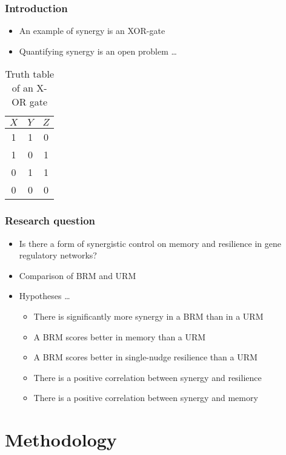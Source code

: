\documentclass[hyperref={pdfpagelabels=false}]{beamer}
\begin{document}
\begin{frame}
\frametitle{Introduction}
\begin{itemize}
\item An example of synergy is an XOR-gate
\item Quantifying synergy is an open problem \cite{griffith2011quantifying, olbrich2015information} \dots{}
\end{itemize}
\begin{table}[ht]
\begin{center}
\begin{tabular}{|c|c||c|}
\hline
$X$ & $Y$ & $Z$ \\
\hline
\hline
1 & 1 & 0 \\
1 & 0 & 1 \\
0 & 1 & 1 \\
0 & 0 & 0 \\
\hline
\end{tabular}
\end{center}
\caption{Truth table of an X-OR gate}
\label{XOR}
\end{table}
\end{frame}

\begin{frame}
\frametitle{Research question}
\begin{itemize}
\item Is there a form of synergistic control on memory and resilience in gene regulatory networks?
\item Comparison of BRM and URM
\item Hypotheses \dots{}
\begin{itemize}
\item There is significantly more synergy in a BRM than in a URM
\item A BRM scores better in memory than a URM
\item A BRM scores better in single-nudge resilience than a URM
\item There is a positive correlation between synergy and resilience
\item There is a positive correlation between synergy and memory
\end{itemize}
\end{itemize}
\end{frame}

\section{Methodology}
\setcounter{subsection}{1}
\end{document}
